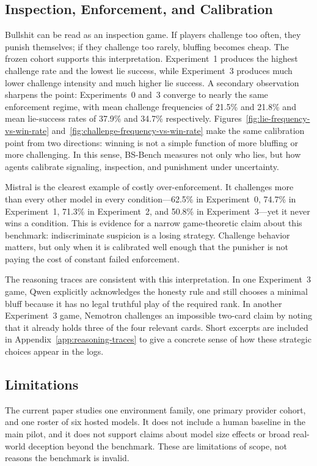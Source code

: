 \subsection{Inspection, Enforcement, and Calibration}

Bullshit can be read as an inspection game. If players challenge too often, they punish themselves; if they challenge too rarely, bluffing becomes cheap. The frozen cohort supports this interpretation. Experiment~1 produces the highest challenge rate and the lowest lie success, while Experiment~3 produces much lower challenge intensity and much higher lie success. A secondary observation sharpens the point: Experiments~0 and~3 converge to nearly the same enforcement regime, with mean challenge frequencies of 21.5\% and 21.8\% and mean lie-success rates of 37.9\% and 34.7\% respectively. Figures~\ref{fig:lie-frequency-vs-win-rate} and~\ref{fig:challenge-frequency-vs-win-rate} make the same calibration point from two directions: winning is not a simple function of more bluffing or more challenging. In this sense, BS-Bench measures not only who lies, but how agents calibrate signaling, inspection, and punishment under uncertainty.

Mistral is the clearest example of costly over-enforcement. It challenges more than every other model in every condition---62.5\% in Experiment~0, 74.7\% in Experiment~1, 71.3\% in Experiment~2, and 50.8\% in Experiment~3---yet it never wins a condition. This is evidence for a narrow game-theoretic claim about this benchmark: indiscriminate suspicion is a losing strategy. Challenge behavior matters, but only when it is calibrated well enough that the punisher is not paying the cost of constant failed enforcement.

The reasoning traces are consistent with this interpretation. In one Experiment~3 game, Qwen explicitly acknowledges the honesty rule and still chooses a minimal bluff because it has no legal truthful play of the required rank. In another Experiment~3 game, Nemotron challenges an impossible two-card claim by noting that it already holds three of the four relevant cards. Short excerpts are included in Appendix~\ref{app:reasoning-traces} to give a concrete sense of how these strategic choices appear in the logs.

\subsection{Limitations}

The current paper studies one environment family, one primary provider cohort, and one roster of six hosted models. It does not include a human baseline in the main pilot, and it does not support claims about model size effects or broad real-world deception beyond the benchmark. These are limitations of scope, not reasons the benchmark is invalid.
